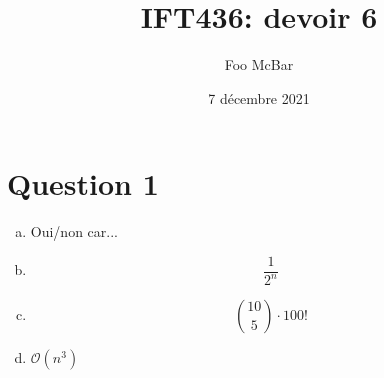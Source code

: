 \documentclass{article}
\title{IFT436: devoir 6}
\author{Foo McBar}
\date{7 décembre 2021}
\renewcommand{\O}{\mathcal{O}}
\begin{document}
\maketitle

\section*{Question 1}

\begin{enumerate}[(a)]
\item Oui/non car...
  
\item \[\frac{1}{2^n}\]

\item \[{10 \choose 5} \cdot 100!\]

\item $\O(n^3)$
\end{enumerate}
\end{document}
